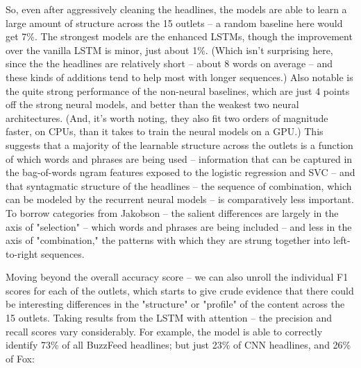 \documentclass{scrartcl}
\begin{document}
So, even after aggressively cleaning the headlines, the models are able to learn a large amount of structure across the 15 outlets -- a random baseline here would get 7\%. The strongest models are the enhanced LSTMs, though the improvement over the vanilla LSTM is minor, just about 1\%. (Which isn't surprising here, since the the headlines are relatively short -- about 8 words on average -- and these kinds of additions tend to help most with longer sequences.) Also notable is the quite strong performance of the non-neural baselines, which are just 4 points off the strong neural models, and better than the weakest two neural architectures. (And, it's worth noting, they also fit two orders of magnitude faster, on CPUs, than it takes to train the neural models on a GPU.) This suggests that a majority of the learnable structure across the outlets is a function of which words and phrases are being used -- information that can be captured in the bag-of-words ngram features exposed to the logistic regression and SVC -- and that syntagmatic structure of the headlines -- the sequence of combination, which can be modeled by the recurrent neural models -- is comparatively less important. To borrow categories from Jakobson -- the salient differences are largely in the axis of "selection" -- which words and phrases are being included -- and less in the axis of "combination," the patterns with which they are strung together into left-to-right sequences.

Moving beyond the overall accuracy score -- we can also unroll the individual F1 scores for each of the outlets, which starts to give crude evidence that there could be interesting differences in the "structure" or "profile" of the content across the 15 outlets. Taking results from the LSTM with attention -- the precision and recall scores vary considerably. For example, the model is able to correctly identify 73\% of all BuzzFeed headlines; but just 23\% of CNN headlines, and 26\% of Fox:
\end{document}
